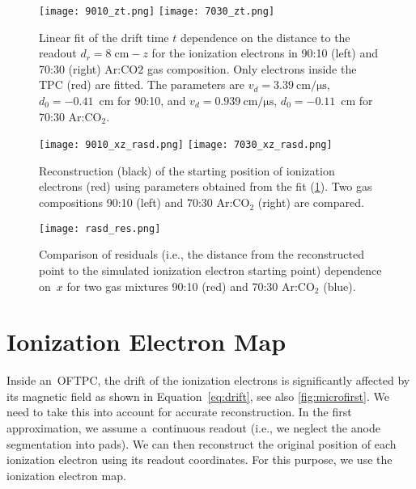 		\begin{figure}
			\centering
			\texttt{[image: 9010\_zt.png]}
			\hfill
			\texttt{[image: 7030\_zt.png]}
			\caption{Linear fit of the drift time $t$ dependence on the distance to the readout $d_r = 8\;\text{cm} - z$ for the ionization electrons in 90:10 (left) and 70:30 (right) Ar:CO$2$ gas composition. Only electrons inside the \ac{TPC} (red) are fitted. The parameters are $v_d = \SI{3.39}{\centi\meter\per\micro\second}$, $d_0 = -0.41$~cm for 90:10, and $v_d = \SI{0.939}{\centi\meter\per\micro\second}$, $d_0 = -0.11$~cm for 70:30 Ar:CO$_2$.}
			\label{fig:zt}
		\end{figure}
		
		\begin{figure}
			\centering
			\texttt{[image: 9010\_xz\_rasd.png]}
			\hfill
			\texttt{[image: 7030\_xz\_rasd.png]}
			\caption{Reconstruction (black) of the starting position of ionization electrons (red) using parameters obtained from the fit (\cref{fig:zt}). Two gas compositions 90:10 (left) and 70:30 Ar:CO$_2$ (right) are compared.}
			\label{fig:rasd_xz}
		\end{figure}
		
		\begin{figure}
			\centering
			\texttt{[image: rasd\_res.png]}
			\caption{Comparison of residuals (i.e., the distance from the reconstructed point to the simulated ionization electron starting point) dependence on~$x$ for two gas mixtures 90:10 (red) and 70:30 Ar:CO$_2$ (blue).}
			\label{fig:rasd_res}
		\end{figure}
	
	\section{Ionization Electron Map}
	\label{sec:map}
		Inside an~\ac{OFTPC}, the drift of the ionization electrons is significantly affected by its magnetic field as shown in Equation~\ref{eq:drift}, see also \cref{fig:microfirst}. We need to take this into account for accurate reconstruction. In the first approximation, we assume a~continuous readout (i.e., we neglect the anode segmentation into pads). We can then reconstruct the original position of each ionization electron using its readout coordinates. For this purpose, we use the ionization electron map.
		
